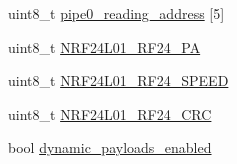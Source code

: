 \begin{DoxyCompactItemize}
\item 
uint8\+\_\+t \hyperlink{classNRF24L01_af836ff0a915587aa40b5eabe4101ea4c}{pipe0\+\_\+reading\+\_\+address} \mbox{[}5\mbox{]}
\item 
uint8\+\_\+t \hyperlink{classNRF24L01_ac798ba6ce52fd4a13eb40ff274818157}{N\+R\+F24\+L01\+\_\+\+R\+F24\+\_\+\+PA}
\item 
uint8\+\_\+t \hyperlink{classNRF24L01_a2dc0073a56f6aca86da205dd720fd132}{N\+R\+F24\+L01\+\_\+\+R\+F24\+\_\+\+S\+P\+E\+ED}
\item 
uint8\+\_\+t \hyperlink{classNRF24L01_af6a260dd55ee5c2f7de7cfac4e91178d}{N\+R\+F24\+L01\+\_\+\+R\+F24\+\_\+\+C\+RC}
\item 
bool \hyperlink{classNRF24L01_ae319d1b6a3d950888d2608cc69efb07c}{dynamic\+\_\+payloads\+\_\+enabled}
\end{DoxyCompactItemize}
